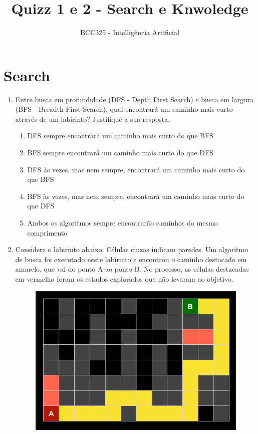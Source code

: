 \documentclass[a4paper,12pt]{article}
\begin{document}
\title{Quizz 1 e 2 - Search e Knwoledge}
\author{BCC325 - Intelligência Artificial}
\date{}
\maketitle


\section*{Search}

\begin{enumerate}
\item Entre busca em profundidade (DFS - Depth First Search) e busca em largura (BFS - Breadth First Search), qual encontrará um caminho mais curto através de um labirinto? Justifique a sua resposta.

\begin{enumerate}
    \item DFS sempre encontrará um caminho mais curto do que BFS
    \item BFS sempre encontrará um caminho mais curto do que DFS
    \item DFS às vezes, mas nem sempre, encontrará um caminho mais curto do que BFS
    \item BFS às vezes, mas nem sempre, encontrará um caminho mais curto do que DFS
    \item Ambos os algoritmos sempre encontrarão caminhos do mesmo comprimento
\end{enumerate}


\item Considere o labirinto abaixo. Células cinzas indicam paredes. Um algoritmo de busca foi executado neste labirinto e encontrou o caminho destacado em amarelo, que vai do ponto A ao ponto B. No processo, as células destacadas em vermelho foram os estados explorados que não levaram ao objetivo.

\begin{figure}[!ht]
    \centering
    \includegraphics[scale=0.5]{maze.png}
\end{figure}


\end{enumerate}
\end{document}
